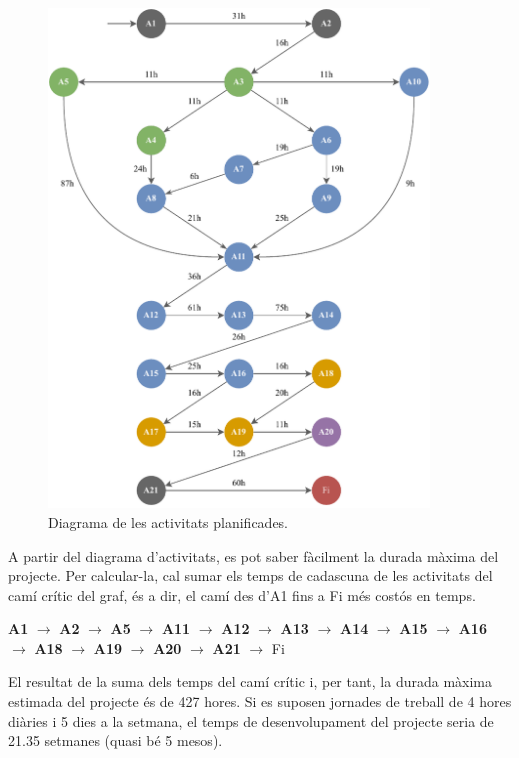 \documentclass[a4paper,12pt]{ThesisStyle}
\begin{document}
\begin{figure}[H]
  \centering
	\includegraphics[width=0.9\textwidth]{assets/planification_figs/activityDiagram.pdf}
	\caption{\label{img:diagrama_activitats}Diagrama de les activitats planificades.}
\end{figure}

A partir del diagrama d'activitats, es pot saber fàcilment la durada màxima del projecte. Per calcular-la, cal sumar els temps de cadascuna de les activitats del camí crític del graf, és a dir, el camí des d'A1 fins a Fi més costós en temps.

\textbf{A1} $\rightarrow$ \textbf{A2} $\rightarrow$ \textbf{A5} $\rightarrow$ \textbf{A11} $\rightarrow$ \textbf{A12} $\rightarrow$ \textbf{A13} $\rightarrow$ \textbf{A14} $\rightarrow$ \textbf{A15} $\rightarrow$ \textbf{A16} $\rightarrow$ \textbf{A18} $\rightarrow$ \textbf{A19} $\rightarrow$ \textbf{A20} $\rightarrow$ \textbf{A21} $\rightarrow$ Fi

El resultat de la suma dels temps del camí crític i, per tant, la durada màxima estimada del projecte és de 427 hores. Si es suposen jornades de treball de 4 hores diàries i 5 dies a la setmana, el temps de desenvolupament del projecte seria de 21.35 setmanes (quasi bé 5 mesos).
\end{document}
